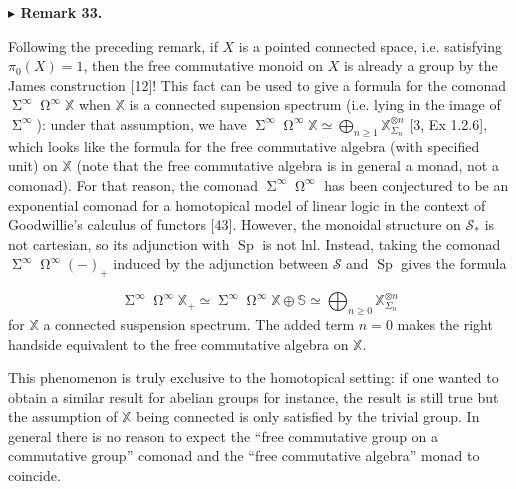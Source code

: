  
 
 
\par\medskip\noindent\textbf{$\blacktriangleright$ Remark 33.}\par
 
 
Following the preceding remark, if $X$ is a pointed connected space, i.e. satisfying $\pi_{0}(X)=1$, then the free commutative monoid on $X$ is already a group by the James construction [12]! This fact can be used to give a formula for the comonad $\operatorname{\Sigma}^{\infty}\operatorname{\Omega}^{\infty}\mathbb{X}$ when $\mathbb{X}$ is a connected supension spectrum (i.e. lying in the image of $\operatorname{\Sigma}^{\infty}$): under that assumption, we have $\operatorname{\Sigma}^{\infty}\operatorname{\Omega}^{\infty}\mathbb{X}\simeq\bigoplus_{n\geq 1}\mathbb{X}^{\otimes n}_{\Sigma_{n}}$ [3, Ex 1.2.6], which looks like the formula for the free commutative algebra (with specified unit) on $\mathbb{X}$ (note that the free commutative algebra is in general a monad, not a comonad). For that reason, the comonad $\operatorname{\Sigma}^{\infty}\operatorname{\Omega}^{\infty}$ has been conjectured to be an exponential comonad for a homotopical model of linear logic in the context of Goodwillie’s calculus of functors [43]. However, the monoidal structure on ${\mathcal{S}}_{*}$ is not cartesian, so its adjunction with $\operatorname{Sp}$ is not lnl. Instead, taking the comonad $\operatorname{\Sigma}^{\infty}\operatorname{\Omega}^{\infty}(-)_{+}$ induced by the adjunction between ${\mathcal{S}}$ and $\operatorname{Sp}$ gives the formula\par
    \[\operatorname{\Sigma}^{\infty}\operatorname{\Omega}^{\infty}\mathbb{X}_{+}\simeq\operatorname{\Sigma}^{\infty}\operatorname{\Omega}^{\infty}\mathbb{X}\oplus\mathbb{S}\simeq\bigoplus_{n\geq 0}\mathbb{X}^{\otimes n}_{\Sigma_{n}}\]    
for $\mathbb{X}$ a connected suspension spectrum. The added term $n=0$ makes the right handside equivalent to the free commutative algebra on $\mathbb{X}$.\par
 
 
 
This phenomenon is truly exclusive to the homotopical setting: if one wanted to obtain a similar result for abelian groups for instance, the result is still true but the assumption of $\mathbb{X}$ being connected is only satisfied by the trivial group. In general there is no reason to expect the “free commutative group on a commutative group” comonad and the “free commutative algebra” monad to coincide.\par
 
